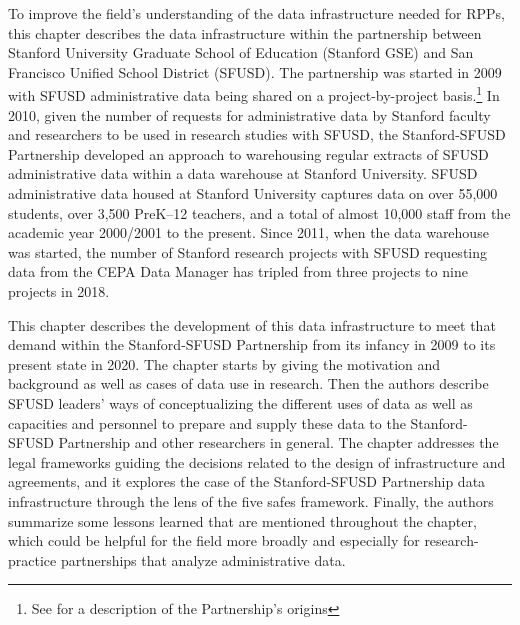 To improve the field's understanding of the data infrastructure needed for RPPs, this chapter describes the data infrastructure within the partnership between Stanford University Graduate School of Education (Stanford GSE) and San Francisco Unified School District (SFUSD). The partnership was started in 2009 with SFUSD administrative data being shared on a project-by-project basis.\footnote{See \citet{wentworth2016} for a description of the Partnership's origins} In 2010, given the number of requests for administrative data by Stanford faculty and researchers to be used in research studies with SFUSD, the Stanford-SFUSD Partnership developed an approach to warehousing regular extracts of SFUSD administrative data within a data warehouse at Stanford University. SFUSD administrative data housed at Stanford University captures data on over 55,000 students, over 3,500 PreK--12 teachers, and a total of almost 10,000 staff from the academic year 2000/2001 to the present. Since 2011, when the data warehouse was started, the number of Stanford research projects with SFUSD requesting data from the CEPA Data Manager has tripled from three projects to nine projects in 2018.

This chapter describes the development of this data infrastructure to meet that demand within the Stanford-SFUSD Partnership from its infancy in 2009 to its present state in 2020. The chapter starts by giving the motivation and background as well as cases of data use in research. Then the authors describe SFUSD leaders' ways of conceptualizing the different uses of data as well as capacities and personnel to prepare and supply these data to the Stanford-SFUSD Partnership and other researchers in general. The chapter addresses the legal frameworks guiding the decisions related to the design of infrastructure and agreements, and it explores the case of the Stanford-SFUSD Partnership data infrastructure through the lens of the five safes framework. Finally, the authors summarize some lessons learned that are mentioned throughout the chapter, which could be helpful for the field more broadly and especially for research-practice partnerships that analyze administrative data.


